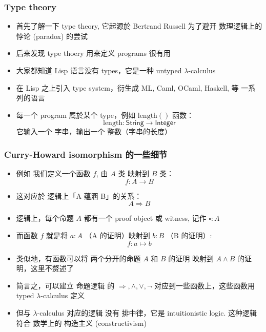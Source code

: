 \documentclass[16pt]{beamer}
\newcommand{\cc}[2]{#1}
\newcommand{\cc}[2]{#2}
\newcommand{\emp}[1]{{\color{violet}#1}}
\begin{document}
\begin{frame}
\frametitle{Type theory}
\begin{itemize}
	\item 首先了解一下 type theory, 它起源於 Bertrand Russell 为了避开 数理逻辑上的 悖论 (paradox) 的尝试

	\item 后来发现 type thoery 用来定义 \emp{programs} 很有用

	\item 大家都知道 Lisp 语言没有 types，它是一种 untyped $\lambda$-calculus

	\item 在 Lisp 之上引入 type system，衍生成 ML, Caml, OCaml, Haskell, 等 一系列的语言

	\item 每一个 program 属於某个 type，例如 $\mathrm{length}()$ 函数：
	\begin{equation}
	\mathrm{length} : \mathsf{String} \rightarrow \mathsf{Integer}
	\end{equation}
	它输入一个 字串，输出一个 整数（字串的长度）
\end{itemize}
\end{frame}

\begin{frame}
\frametitle{Curry-Howard isomorphism 的一些细节}
\begin{itemize}
	\item 例如 我们定义一个函数 $f$, 由 $A$ 类 映射到 $B$ 类：
	\begin{equation}
	f: A \rightarrow B
	\end{equation}

	\item 这对应於 逻辑上「A 蕴涵 B」的关系：
	\begin{equation}
	A \Rightarrow B
	\end{equation}
	
	\item \cc{逻辑上，每个命题 $A$ 都有一个 \emp{proof object} 或 \emp{witness}, 记作 $\square : A$}
	{In logic, for each proposition $A$ would be associated a \emp{proof object} or \emp{witness} $\square : A$}

	\item 而函数 $f$ 就是将 $a:A$ （A 的证明）映射到 $b:B$ （B 的证明）:
	\begin{equation}
	f: a \mapsto b
	\end{equation}

	\item 类似地，有函数可以将 两个分开的命题 $A$ 和 $B$ 的证明 映射到 $A \wedge B$ 的证明，这里不赘述了
	
	\item 简言之，可以建立 \emp{命题逻辑} 的 $\Rightarrow, \wedge, \vee, \neg$ 对应到一些函数上，这些函数用 typed $\lambda$-calculus 定义
	
	\item 但与 $\lambda$-calculus 对应的逻辑 没有 \emp{排中律}，它是 intuitionistic logic.  这种逻辑 符合 数学上的 构造主义 (constructivism)
\end{itemize}
\end{frame}
\end{document}
